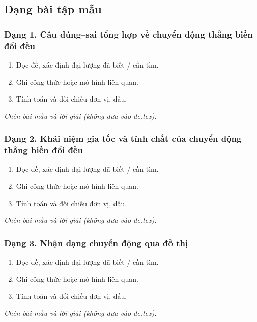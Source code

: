 

\subsection{Dạng bài tập mẫu}
\subsubsection{Dạng 1. Câu đúng--sai tổng hợp về chuyển động thẳng biến đổi đều}
\begin{phuongphap}
\begin{enumerate}
\item Đọc đề, xác định đại lượng đã biết / cần tìm.
\item Ghi công thức hoặc mô hình liên quan.
\item Tính toán và đối chiếu đơn vị, dấu.
\end{enumerate}
\end{phuongphap}
\begin{vidumau}
\textit{Chèn bài mẫu và lời giải (không đưa vào de.tex).}
\end{vidumau}

\subsubsection{Dạng 2. Khái niệm gia tốc và tính chất của chuyển động thẳng biến đổi đều}
\begin{phuongphap}
\begin{enumerate}
\item Đọc đề, xác định đại lượng đã biết / cần tìm.
\item Ghi công thức hoặc mô hình liên quan.
\item Tính toán và đối chiếu đơn vị, dấu.
\end{enumerate}
\end{phuongphap}
\begin{vidumau}
\textit{Chèn bài mẫu và lời giải (không đưa vào de.tex).}
\end{vidumau}

\subsubsection{Dạng 3. Nhận dạng chuyển động qua đồ thị}
\begin{phuongphap}
\begin{enumerate}
\item Đọc đề, xác định đại lượng đã biết / cần tìm.
\item Ghi công thức hoặc mô hình liên quan.
\item Tính toán và đối chiếu đơn vị, dấu.
\end{enumerate}
\end{phuongphap}
\begin{vidumau}
\textit{Chèn bài mẫu và lời giải (không đưa vào de.tex).}
\end{vidumau}

